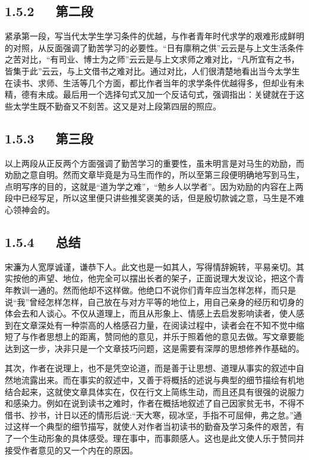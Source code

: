 \documentclass[letterpaper,12pt,english]{sphinxmanual}
\begin{document}
\subsection{1.5.2   第二段}
\label{\detokenize{p01_u6563_u6587/_u5b8b_u6fc2-_u9001_u4e1c_u9633_u9a6c_u751f_u5e8f:id9}}
紧承第一段，写当代太学生学习条件的优越，与作者青年时代求学的艰难形成鲜明的对照，从反面强调了勤苦学习的必要性。“日有廪稍之供”云云是与上文生活条件之苦对比，“有司业、博士为之师”云云是与上文求师之难对比，“凡所宜有之书，皆集于此”云云，与上文借书之难对比。通过对比，人们很清楚地看出当今太学生在读书、求师、生活等几个方面，都比作者当年的求学条件优越得多，但却业有未精，德有未成。最后用一个选择句式又加一个反诘句式，强调指出：关键就在于这些太学生既不勤奋又不刻苦。这又是对上段第四层的照应。


\subsection{1.5.3   第三段}
\label{\detokenize{p01_u6563_u6587/_u5b8b_u6fc2-_u9001_u4e1c_u9633_u9a6c_u751f_u5e8f:id10}}
以上两段从正反两个方面强调了勤苦学习的重要性，虽未明言是对马生的劝励，而劝励之意自明。然而文章毕竟是为马生而作的，所以至第三段便明确地写到马生，点明写序的目的，这就是“道为学之难”，“勉乡人以学者”。因为劝励的内容在上两段中已经写足，所以这里便只讲些推奖褒美的话，但是殷切款诚之意，马生是不难心领神会的。


\subsection{1.5.4   总结}
\label{\detokenize{p01_u6563_u6587/_u5b8b_u6fc2-_u9001_u4e1c_u9633_u9a6c_u751f_u5e8f:id11}}
宋濂为人宽厚诚谨，谦恭下人。此文也是一如其人，写得情辞婉转，平易亲切。其实按他的声望、地位，他完全可以摆出长者的架子，正面说理大发议论，把这个青年教训一通的。然而他却不这样做。他绝口不说你们青年应当怎样怎样，而只是说“我”曾经怎样怎样，自己放在与对方平等的地位上，用自己亲身的经历和切身的体会去和人谈心。不仅从道理上，而且从形象上、情感上去启发影响读者，使人感到在文章深处有一种崇高的人格感召力量，在阅读过程中，读者会在不知不觉中缩短了与作者思想上的距离，赞同他的意见，并乐于照着他的意见去做。写文章要能达到这一步，决非只是一个文章技巧问题，这是需要有深厚的思想修养作基础的。

其次，作者在说理上，也不是凭空论道，而是善于让思想、道理从事实的叙述中自然地流露出来。而在事实的叙述中，又善于将概括的述说与典型的细节描绘有机地结合起来，这就使文章具体实在，仅在行文上简练生动，而且还具有很强的说服力和感染力。例如在说到读书之难时，作者在概括地叙述了自己因家贫无书，不得不借书、抄书，计日以还的情形后说:“天大寒，砚冰坚，手指不可屈伸，弗之怠。”通过这样一个典型的细节描写，就使人对作者当初读书的勤奋及学习条件的艰苦，有了一个生动形象的具体感受。理在事中，而事颇感人。这也是此文使人乐于赞同并接受作者意见的又一个内在的原因。
\end{document}
